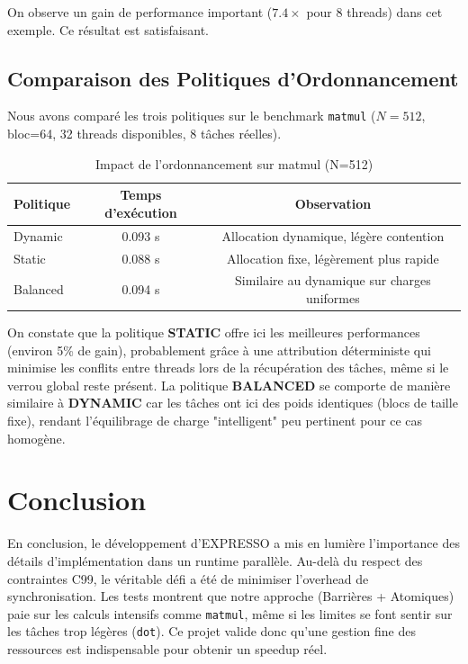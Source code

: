 \documentclass[a4paper,11pt]{article}
\begin{document}
On observe un gain de performance important ($7.4\times$ pour 8 threads) dans cet exemple. Ce résultat est satisfaisant.

\subsection{Comparaison des Politiques d'Ordonnancement}

Nous avons comparé les trois politiques sur le benchmark \texttt{matmul} ($N=512$, bloc=64, 32 threads disponibles, 8 tâches réelles).

\begin{table}[h]
\centering
\begin{tabular}{|l|c|c|}
\hline
\textbf{Politique} & \textbf{Temps d'exécution} & \textbf{Observation} \\ \hline
Dynamic  & 0.093 s & Allocation dynamique, légère contention \\ \hline
Static   & 0.088 s & Allocation fixe, légèrement plus rapide \\ \hline
Balanced & 0.094 s & Similaire au dynamique sur charges uniformes \\ \hline
\end{tabular}
\caption{Impact de l'ordonnancement sur matmul (N=512)}
\label{tab:sched_compare}
\end{table}

On constate que la politique \textbf{STATIC} offre ici les meilleures performances (environ 5\% de gain), probablement grâce à une attribution déterministe qui minimise les conflits entre threads lors de la récupération des tâches, même si le verrou global reste présent. La politique \textbf{BALANCED} se comporte de manière similaire à \textbf{DYNAMIC} car les tâches ont ici des poids identiques (blocs de taille fixe), rendant l'équilibrage de charge "intelligent" peu pertinent pour ce cas homogène.

\section{Conclusion}

En conclusion, le développement d'EXPRESSO a mis en lumière l'importance des détails d'implémentation dans un runtime parallèle. Au-delà du respect des contraintes C99, le véritable défi a été de minimiser l'overhead de synchronisation. Les tests montrent que notre approche (Barrières + Atomiques) paie sur les calculs intensifs comme \texttt{matmul}, même si les limites se font sentir sur les tâches trop légères (\texttt{dot}). Ce projet valide donc qu'une gestion fine des ressources est indispensable pour obtenir un speedup réel.
\end{document}
